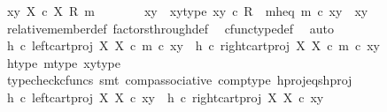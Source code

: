 \begin{isabellebody}
\ {\isachardoublequoteopen}{\isasymlangle}x{\isacharcomma}{\kern0pt}y{\isasymrangle}\ {\isasymin}\isactrlbsub X\ {\isasymtimes}\isactrlsub c\ X\isactrlesub \ {\isacharparenleft}{\kern0pt}R{\isacharcomma}{\kern0pt}\ m{\isacharparenright}{\kern0pt}{\isachardoublequoteclose}\isanewline
\ \ \ \ \isamarkupfalse%
\ \isamarkupfalse%
\ xy\ \ xy{\isacharunderscore}{\kern0pt}type{\isacharcolon}{\kern0pt}\ {\isachardoublequoteopen}xy\ {\isasymin}\isactrlsub c\ R{\isachardoublequoteclose}\ \ m{\isacharunderscore}{\kern0pt}h{\isacharunderscore}{\kern0pt}eq{\isacharcolon}{\kern0pt}\ {\isachardoublequoteopen}m\ {\isasymcirc}\isactrlsub c\ xy\ {\isacharequal}{\kern0pt}\ {\isasymlangle}x{\isacharcomma}{\kern0pt}y{\isasymrangle}{\isachardoublequoteclose}\isanewline
\ \ \ \ \ \ \isamarkupfalse%
\ relative{\isacharunderscore}{\kern0pt}member{\isacharunderscore}{\kern0pt}def{}\ factors{\isacharunderscore}{\kern0pt}through{\isacharunderscore}{\kern0pt}def\ \isamarkupfalse%
\ cfunc{\isacharunderscore}{\kern0pt}type{\isacharunderscore}{\kern0pt}def\ \isamarkupfalse%
\ auto\isanewline
\isanewline
\ \ \ \ \isamarkupfalse%
\ {\isachardoublequoteopen}h\ {\isasymcirc}\isactrlsub c\ left{\isacharunderscore}{\kern0pt}cart{\isacharunderscore}{\kern0pt}proj\ X\ X\ {\isasymcirc}\isactrlsub c\ m\ {\isasymcirc}\isactrlsub c\ xy\ {\isacharequal}{\kern0pt}\ h\ {\isasymcirc}\isactrlsub c\ right{\isacharunderscore}{\kern0pt}cart{\isacharunderscore}{\kern0pt}proj\ X\ X\ {\isasymcirc}\isactrlsub c\ m\ {\isasymcirc}\isactrlsub c\ xy{\isachardoublequoteclose}\isanewline
\ \ \ \ \ \ \isamarkupfalse%
\ h{\isacharunderscore}{\kern0pt}type\ m{\isacharunderscore}{\kern0pt}type\ xy{\isacharunderscore}{\kern0pt}type\ \isamarkupfalse%
\ {\isacharparenleft}{\kern0pt}typecheck{\isacharunderscore}{\kern0pt}cfuncs{\isacharcomma}{\kern0pt}\ smt\ comp{\isacharunderscore}{\kern0pt}associative{}\ comp{\isacharunderscore}{\kern0pt}type\ h{\isacharunderscore}{\kern0pt}proj{}{\isacharunderscore}{\kern0pt}eqs{\isacharunderscore}{\kern0pt}h{\isacharunderscore}{\kern0pt}proj{}{\isacharparenright}{\kern0pt}\isanewline
\ \ \ \ \isamarkupfalse%
\ \isamarkupfalse%
\ {\isachardoublequoteopen}h\ {\isasymcirc}\isactrlsub c\ left{\isacharunderscore}{\kern0pt}cart{\isacharunderscore}{\kern0pt}proj\ X\ X\ {\isasymcirc}\isactrlsub c\ {\isasymlangle}x{\isacharcomma}{\kern0pt}y{\isasymrangle}\ {\isacharequal}{\kern0pt}\ h\ {\isasymcirc}\isactrlsub c\ right{\isacharunderscore}{\kern0pt}cart{\isacharunderscore}{\kern0pt}proj\ X\ X\ {\isasymcirc}\isactrlsub c\ {\isasymlangle}x{\isacharcomma}{\kern0pt}y{\isasymrangle}{\isachardoublequoteclose}\isanewline

\end{isabellebody}
